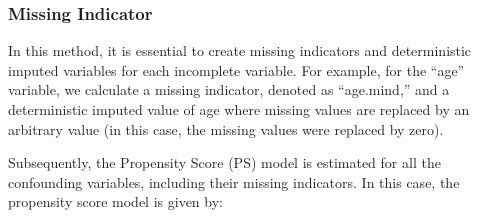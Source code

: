 \documentclass[
  letterpaper,
  DIV=11,
  numbers=noendperiod]{scrreprt}
\newenvironment{Shaded}{\begin{snugshade}}{\end{snugshade}}
\newcommand{\AttributeTok}[1]{\textcolor[rgb]{0.40,0.45,0.13}{#1}}
\newcommand{\CommentTok}[1]{\textcolor[rgb]{0.37,0.37,0.37}{#1}}
\newcommand{\DecValTok}[1]{\textcolor[rgb]{0.68,0.00,0.00}{#1}}
\newcommand{\FunctionTok}[1]{\textcolor[rgb]{0.28,0.35,0.67}{#1}}
\newcommand{\NormalTok}[1]{\textcolor[rgb]{0.00,0.23,0.31}{#1}}
\newcommand{\OtherTok}[1]{\textcolor[rgb]{0.00,0.23,0.31}{#1}}
\newcommand{\SpecialCharTok}[1]{\textcolor[rgb]{0.37,0.37,0.37}{#1}}
\newcommand{\StringTok}[1]{\textcolor[rgb]{0.13,0.47,0.30}{#1}}
\begin{document}
\begin{Shaded}
\end{Shaded}

\hypertarget{missing-indicator}{%
\subsubsection{Missing Indicator}\label{missing-indicator}}

In this method, it is essential to create missing indicators and
deterministic imputed variables for each incomplete variable. For
example, for the ``age'' variable, we calculate a missing indicator,
denoted as ``age.mind,'' and a deterministic imputed value of age where
missing values are replaced by an arbitrary value (in this case, the
missing values were replaced by zero).

\begin{Shaded}
\end{Shaded}

Subsequently, the Propensity Score (PS) model is estimated for all the
confounding variables, including their missing indicators. In this case,
the propensity score model is given by:
\end{document}
